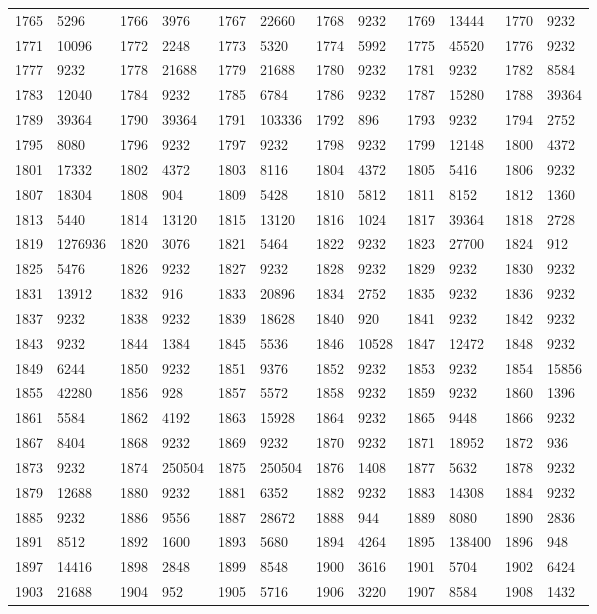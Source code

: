 \begin{longtable}{llllllllllll}
1765 & 5296&1766 &3976&1767& 22660&1768 &9232&1769 &13444&1770& 9232\\
1771 & 10096&1772 &2248&1773& 5320&1774 &5992&1775 &45520&1776& 9232\\
1777 & 9232&1778 &21688&1779& 21688&1780 &9232&1781 &9232&1782& 8584\\
1783 & 12040&1784 &9232&1785& 6784&1786 &9232&1787 &15280&1788& 39364\\
1789 & 39364&1790 &39364&1791& 103336&1792 &896&1793 &9232&1794& 2752\\
1795 & 8080&1796 &9232&1797& 9232&1798 &9232&1799 &12148&1800& 4372\\
1801 & 17332&1802 &4372&1803& 8116&1804 &4372&1805 &5416&1806& 9232\\
1807 & 18304&1808 &904&1809& 5428&1810 &5812&1811 &8152&1812& 1360\\
1813 & 5440&1814 &13120&1815& 13120&1816 &1024&1817 &39364&1818& 2728\\
1819 & 1276936&1820 &3076&1821& 5464&1822 &9232&1823 &27700&1824& 912\\
1825 & 5476&1826 &9232&1827& 9232&1828 &9232&1829 &9232&1830& 9232\\
1831 & 13912&1832 &916&1833& 20896&1834 &2752&1835 &9232&1836& 9232\\
1837 & 9232&1838 &9232&1839& 18628&1840 &920&1841 &9232&1842& 9232\\
1843 & 9232&1844 &1384&1845& 5536&1846 &10528&1847 &12472&1848& 9232\\
1849 & 6244&1850 &9232&1851& 9376&1852 &9232&1853 &9232&1854& 15856\\
1855 & 42280&1856 &928&1857& 5572&1858 &9232&1859 &9232&1860& 1396\\
1861 & 5584&1862 &4192&1863& 15928&1864 &9232&1865 &9448&1866& 9232\\
1867 & 8404&1868 &9232&1869& 9232&1870 &9232&1871 &18952&1872& 936\\
1873 & 9232&1874 &250504&1875& 250504&1876 &1408&1877 &5632&1878& 9232\\
1879 & 12688&1880 &9232&1881& 6352&1882 &9232&1883 &14308&1884& 9232\\
1885 & 9232&1886 &9556&1887& 28672&1888 &944&1889 &8080&1890& 2836\\
1891 & 8512&1892 &1600&1893& 5680&1894 &4264&1895 &138400&1896& 948\\
1897 & 14416&1898 &2848&1899& 8548&1900 &3616&1901 &5704&1902& 6424\\
1903 & 21688&1904 &952&1905& 5716&1906 &3220&1907 &8584&1908& 1432\\

\end{longtable}
